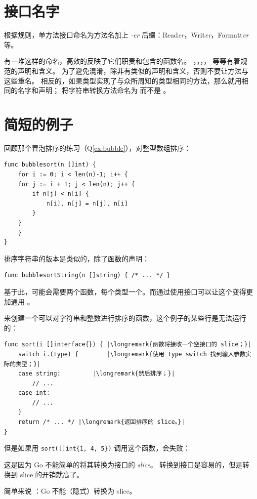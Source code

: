 \section{接口名字}
根据规则，单方法接口命名为方法名加上 \emph{-er} 后缀：Read\emph{er}，Writ\emph{er}，Formatt\emph{er} 等。

有一堆这样的命名，高效的反映了它们职责和包含的函数名。
，，，， 等等有着规范的声明和含义。
为了避免混淆，除非有类似的声明和含义，否则不要让方法与这些重名。
相反的，如果类型实现了与众所周知的类型相同的方法，那么就用相同的名字和声明；
将字符串转换方法命名为  而不是 。

\section{简短的例子}
\label{sec:a sorting example}
回顾那个冒泡排序的练习（Q\ref{ex:bubble}），对整型数组排序：
\begin{lstlisting}
func bubblesort(n []int) {
    for i := 0; i < len(n)-1; i++ {
	for j := i + 1; j < len(n); j++ {
	    if n[j] < n[i] {
		    n[i], n[j] = n[j], n[i]
	    }
	}
    }
}
\end{lstlisting}
排序字符串的版本是类似的，除了函数的声明：
\begin{lstlisting}
func bubblesortString(n []string) { /* ... */ }
\end{lstlisting}
基于此，可能会需要两个函数，每个类型一个。而通过使用接口可以让这个变得更加通用 。

来创建一个可以对字符串和整数进行排序的函数，这个例子的某些行是无法运行的：
\begin{lstlisting}
func sort(i []interface{}) { |\longremark{函数将接收一个空接口的 slice；}|
    switch i.(type) {        |\longremark{使用 type switch 找到输入参数实际的类型；}|
	case string:         |\longremark{然后排序；}|
	    // ...
	case int:
	    // ...
    }
    return /* ... */ |\longremark{返回排序的 slice。}|
}
\end{lstlisting}
\showremarks
但是如果用 \lstinline|sort([]int{1, 4, 5})| 调用这个函数，会失败：

这是因为 Go 不能简单的将其转换为接口的 \emph{slice}。
转换到接口是容易的，但是转换到 slice 的开销就高了。

简单来说
：Go 不能（隐式）转换为 slice。

